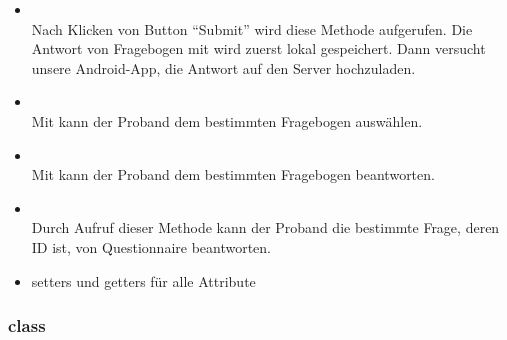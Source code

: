 \documentclass[a4paper]{scrreprt}
\begin{document}
{\begin{enumerate}
\begin{itemize}
                                \item {\large {}}\\
                                    Nach Klicken von Button ``Submit'' wird diese Methode aufgerufen. Die Antwort von Fragebogen mit  wird zuerst lokal gespeichert. Dann versucht unsere Android-App, die Antwort auf den Server hochzuladen.
                                \item {\large {}}\\
                                    Mit  kann der Proband dem bestimmten Fragebogen auswählen.
                                \item {\large {}}\\
                                    Mit  kann der Proband dem bestimmten Fragebogen beantworten.
                                \item {\large {}}\\
                                    Durch Aufruf dieser Methode kann der Proband die bestimmte Frage, deren ID  ist, von Questionnaire  beantworten.
                                \item {\large setters und getters für alle Attribute}
                            \end{itemize}
                    \end{enumerate}




                \subsubsection{class }

}
\end{document}
